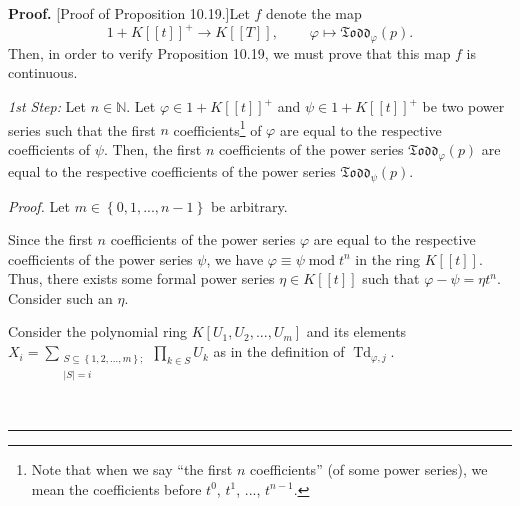 \documentclass[numbers=enddot,12pt,final,onecolumn,notitlepage]{scrartcl}%
\newenvironment{proof}[1][Proof]{\noindent\textbf{#1.} }{\ \rule{0.5em}{0.5em}}
\begin{document}
\begin{proof}
[Proof of Proposition 10.19.]Let $f$ denote the map
\[
1+K\left[  \left[  t\right]  \right]  ^{+}\rightarrow K\left[  \left[
T\right]  \right]  ,\ \ \ \ \ \ \ \ \ \ \varphi\mapsto\mathfrak{Todd}%
_{\varphi}\left(  p\right)  .
\]
Then, in order to verify Proposition 10.19, we must prove that this map $f$ is continuous.

\textit{1st Step:} Let $n\in\mathbb{N}$. Let $\varphi\in1+K\left[  \left[
t\right]  \right]  ^{+}$ and $\psi\in1+K\left[  \left[  t\right]  \right]
^{+}$ be two power series such that the first $n$ coefficients\footnote{Note
that when we say ``the first $n$ coefficients'' (of some power series), we
mean the coefficients before $t^{0}$, $t^{1}$, $...$, $t^{n-1}$.} of $\varphi$
are equal to the respective coefficients of $\psi$. Then, the first $n$
coefficients of the power series $\mathfrak{Todd}_{\varphi}\left(  p\right)  $
are equal to the respective coefficients of the power series $\mathfrak{Todd}%
_{\psi}\left(  p\right)  $.

\textit{Proof.} Let $m\in\left\{  0,1,...,n-1\right\}  $ be arbitrary.

Since the first $n$ coefficients of the power series $\varphi$ are equal to
the respective coefficients of the power series $\psi$, we have $\varphi
\equiv\psi\operatorname{mod}t^{n}$ in the ring $K\left[  \left[  t\right]
\right]  $. Thus, there exists some formal power series $\eta\in K\left[
\left[  t\right]  \right]  $ such that $\varphi-\psi=\eta t^{n}$. Consider
such an $\eta$.

Consider the polynomial ring $K\left[  U_{1},U_{2},...,U_{m}\right]  $ and its
elements $X_{i}=\sum\limits_{\substack{S\subseteq\left\{  1,2,...,m\right\}
;\\\left\vert S\right\vert =i}}\prod\limits_{k\in S}U_{k}$ as in the
definition of $\operatorname*{Td}\nolimits_{\varphi,j}$.


\end{proof}
\end{document}
